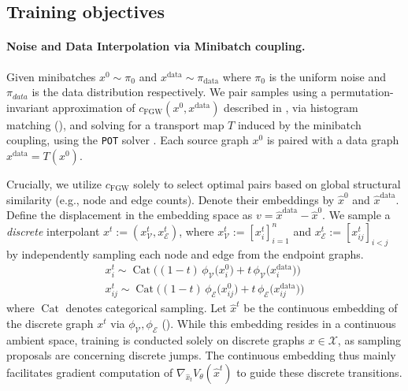 \subsection{Training objectives}
\label{sec:training}

\paragraph{Noise and Data Interpolation via Minibatch coupling.}
Given minibatches \( x^0 \sim \pi_0 \) and \( x^\mathrm{data} \sim \pi_\mathrm{data} \) where $\pi_0$ is the uniform noise and $\pi_{data}$ is the data distribution respectively. We pair samples using a permutation-invariant approximation of \( c_{\mathrm{FGW}}(x^0,x^\mathrm{data}) \) described in , via histogram matching (), and solving for a transport map \( T \) induced by the minibatch coupling, using the \texttt{POT} solver \citep{Flamary2021}.
 Each source graph $x^0$ is paired with a data graph $x^\mathrm{data}=T(x^0)$.

Crucially, we utilize $c_{\mathrm{FGW}}$ solely to select optimal pairs based on global structural similarity (e.g., node and edge counts). %
Denote their embeddings by $\hat{x}^0$ and $\hat{x}^\mathrm{data}$. Define the
displacement in the embedding space as $v=\hat{x}^\mathrm{data}-\hat{x}^0$.
We sample a \emph{discrete} interpolant $x^t:=(x^t_\mathcal{V},x^t_\mathcal{E})$, where $x_\mathcal{V}^t:= [x_i^t]_{i=1}^n$ and $x_\mathcal{E}^t := [x_{ij}^t]_{i<j}$ by independently sampling each node and edge from the endpoint graphs.
\begin{eqnarray}
x_i^t \sim \operatorname{Cat}\Big((1-t)\,\phi_\mathcal{V}\big(x_i^0\big) + t\,\phi_\mathcal{V}\big(x_i^{\mathrm{data}}\big)\Big)\\
x_{ij}^t \sim \operatorname{Cat}\Big((1-t)\,\phi_\mathcal{E}\big(x_{ij}^0\big) + t\,\phi_\mathcal{E}\big(x_{ij}^{\mathrm{data}}\big)\Big)
\end{eqnarray}
where $\operatorname{Cat}$ denotes categorical sampling. Let $\hat{x}^t$ be the continuous embedding of the discrete graph $x^t$ via $\phi_\mathcal{V},\phi_\mathcal{E}$ (). While this embedding resides in a continuous ambient space, training is conducted solely on discrete graphs $x \in \mathcal{X}$, as sampling proposals are concerning discrete jumps. The continuous embedding thus mainly facilitates gradient computation of $\nabla_{\hat{x}_t} V_\theta(\hat{x}^t)$ to guide these discrete transitions.



